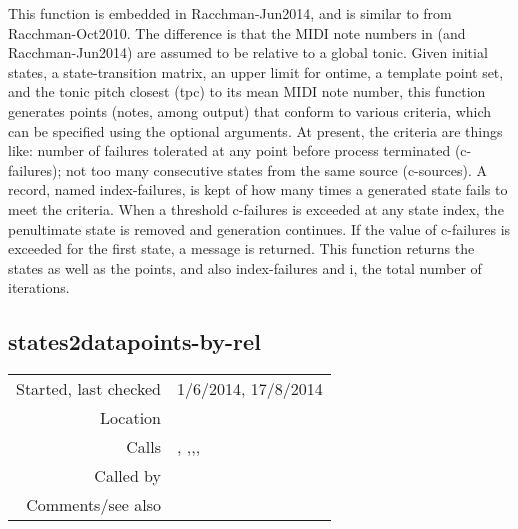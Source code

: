 \noindent This function is embedded in
Racchman-Jun2014, and is similar to
 from
Racchman-Oct2010. The difference is that the MIDI note
numbers in  (and
Racchman-Jun2014) are assumed to be relative to a
global tonic. Given initial states, a state-transition
matrix, an upper limit for ontime, a template point
set, and the tonic pitch closest (tpc) to its mean
MIDI note number, this function generates points
(notes, among output) that conform to various
criteria, which can be specified using the optional
arguments. At present, the criteria are things like:
number of failures tolerated at any point before
process terminated (c-failures); not too many
consecutive states from the same source (c-sources).
A record, named index-failures, is kept of how many
times a generated state fails to meet the criteria.
When a threshold c-failures is exceeded at any state
index, the penultimate state is removed and generation
continues. If the value of c-failures is exceeded for
the first state, a message is returned. This function
returns the states as well as the points, and also
index-failures and i, the total number of
iterations.


\subsection*{states2datapoints-by-rel}\label{fun:states2datapoints-by-rel}

\vspace{0.3cm}
\begin{tabular}{r|p{8cm}}
Started, last checked & 1/6/2014, 17/8/2014 \\
Location & \nameref{sec:generating-beat-relative-MNN} \\
Calls & \nameref{fun:add-to-list}, \nameref{fun:fibonacci-list},\newline \nameref{fun:half-state2datapoints-by-lookup},\newline \nameref{fun:nth-list-of-lists}, \nameref{fun:state-durations-by-beat} \\
Called by & \nameref{fun:generate-beat-rel-MNN->} \\
Comments/see also & \nameref{fun:states2datapoints-by-lookup}
\end{tabular}

